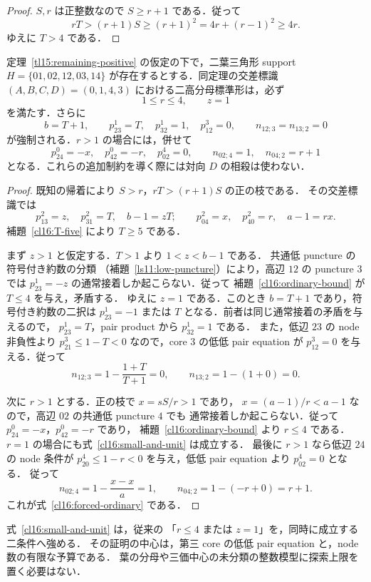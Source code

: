 \begin{proof}
$S,r$ は正整数なので $S\ge r+1$ である．従って
\[
 rT>(r+1)S\ge(r+1)^2=4r+(r-1)^2\ge4r.
\]
ゆえに $T>4$ である．
\end{proof}

\begin{theorem}
\label{cl16:two-leaf-unit}
定理~\ref{tl15:remaining-positive} の仮定の下で，二葉三角形 support
$H=\{01,02,12,03,14\}$ が存在するとする．同定理の交差標識
$(A,B,C,D)=(0,1,4,3)$ における二高分母標準形は，必ず
\begin{equation}\label{cl16:small-and-unit}
 1\le r\le4,\qquad z=1
\end{equation}
を満たす．さらに
\begin{equation}\label{cl16:forced-exception}
 b=T+1,\qquad
 p^1_{23}=T,\quad p^1_{32}=1,\quad
 p^3_{12}=0,\qquad
 n_{12;3}=n_{13;2}=0
\end{equation}
が強制される．$r>1$ の場合には，併せて
\begin{equation}\label{cl16:forced-ordinary}
 p^0_{24}=-x,\quad p^0_{42}=-r,\quad p^4_{02}=0,\qquad
 n_{02;4}=1,\quad n_{04;2}=r+1
\end{equation}
となる．これらの追加制約を導く際には対向 $D$ の相殺は使わない．
\end{theorem}

\begin{proof}
既知の帰着により $S>r$，$rT>(r+1)S$ の正の枝である．
その交差標識では
\[
 p^2_{13}=z,\quad p^2_{31}=T,\quad b-1=zT;
 \qquad
 p^2_{04}=x,\quad p^2_{40}=r,\quad a-1=rx.
\]
補題~\ref{cl16:T-five} により $T\ge5$ である．

まず $z>1$ と仮定する．$T>1$ より $1<z<b-1$ である．
共通低 puncture の符号付き約数の分類
（補題~\ref{ls11:low-puncture}）により，高辺 $12$ の puncture $3$ では
$p^1_{23}=-z$ の通常接着しか起こらない．従って
補題~\ref{cl16:ordinary-bound} が $T\le4$ を与え，矛盾する．
ゆえに $z=1$ である．このとき $b=T+1$ であり，符号付き約数の二択は
$p^1_{23}=-1$ または $T$ となる．前者は同じ通常接着の矛盾を与えるので，
$p^1_{23}=T$，pair product から $p^1_{32}=1$ である．
また，低辺 $23$ の node 非負性より
$p^3_{21}\le1-T<0$ なので，core $3$ の低低 pair equation が
$p^3_{12}=0$ を与える．従って
\[
 n_{12;3}=1-\frac{1+T}{T+1}=0,\qquad
 n_{13;2}=1-(1+0)=0.
\]

次に $r>1$ とする．正の枝で $x=sS/r>1$ であり，
$x=(a-1)/r<a-1$ なので，高辺 $02$ の共通低 puncture $4$ でも
通常接着しか起こらない．従って $p^0_{24}=-x$，$p^0_{42}=-r$ であり，
補題~\ref{cl16:ordinary-bound} より $r\le4$ である．
$r=1$ の場合にも式~\eqref{cl16:small-and-unit} は成立する．
最後に $r>1$ なら低辺 $24$ の node 条件が
$p^4_{20}\le1-r<0$ を与え，低低 pair equation より $p^4_{02}=0$ となる．
従って
\[
 n_{02;4}=1-\frac{x-x}{a}=1,\qquad
 n_{04;2}=1-(-r+0)=r+1.
\]
これが式~\eqref{cl16:forced-ordinary} である．
\end{proof}

式~\eqref{cl16:small-and-unit} は，従来の
「$r\le4$ または $z=1$」を，同時に成立する二条件へ強める．
その証明の中心は，第三 core の低低 pair equation と，node 数の有限な予算である．
葉の分母や三価中心の未分類の整数模型に探索上限を置く必要はない．

